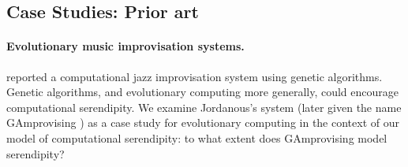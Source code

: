 

\subsection{Case Studies: Prior art}
\label{sec:priorart}

\paragraph{Evolutionary music improvisation systems.}

 reported a computational jazz improvisation system using genetic algorithms. Genetic algorithms, and evolutionary computing more generally, could encourage computational serendipity. We examine Jordanous's system (later given the name {\sf GAmprovising} \cite{jordanous:12}) as a case study for evolutionary computing in the context of our model of computational serendipity: to what extent does {\sf GAmprovising} model serendipity?

